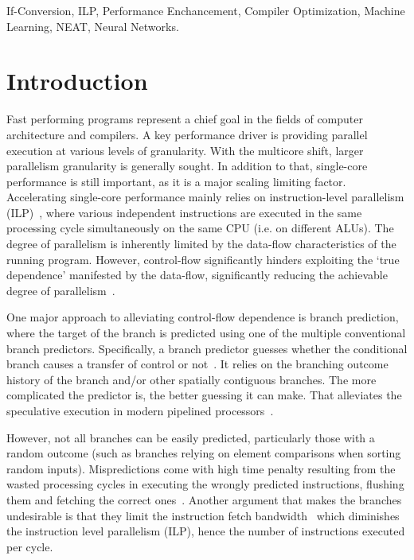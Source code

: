 \documentclass[preprint,nocopyrightspace]{sigplanconf}
\begin{document}
\keywords
If-Conversion, ILP, Performance Enchancement, Compiler Optimization, Machine Learning, NEAT, Neural Networks.

\section{Introduction}

Fast performing programs represent a chief goal in the fields of computer architecture and compilers. A key performance driver is providing parallel execution at various levels of granularity. With the multicore shift, larger parallelism granularity is generally sought. In addition to that, single-core performance is still important, as it is a major scaling limiting factor. Accelerating single-core performance mainly relies on instruction-level parallelism (ILP)~\cite{wall1991limits}, where various independent instructions are executed in the same processing cycle simultaneously on the same CPU (i.e. on different ALUs). The degree of parallelism is inherently limited by the data-flow characteristics of the running program. However, control-flow significantly hinders exploiting the `true dependence' manifested by the data-flow, significantly reducing the achievable degree of parallelism~\cite{Allen:1983:CCD:567067.567085}. 

One major approach to alleviating control-flow dependence is branch prediction, where the target of the branch is predicted using one of the multiple conventional branch predictors. Specifically, a branch predictor guesses whether the conditional branch causes a transfer of control or not~\cite{smith1981study}. It relies on the branching outcome history of the branch and/or other spatially contiguous branches. The more complicated the predictor is, the better guessing it can make. That alleviates the speculative execution in modern pipelined processors~\cite{1998dynamic}.

However, not all branches can be easily predicted, particularly those with a random outcome (such as branches relying on element comparisons when sorting random inputs). Mispredictions come with high time penalty resulting from the wasted processing cycles in executing the wrongly predicted instructions, flushing them and fetching the correct ones~\cite{hennessy2011computer}. 
Another argument that makes the branches undesirable is that they limit the instruction fetch bandwidth~\cite{shen2013modern} which diminishes the instruction level parallelism (ILP), hence the number of instructions executed per cycle.
\end{document}
